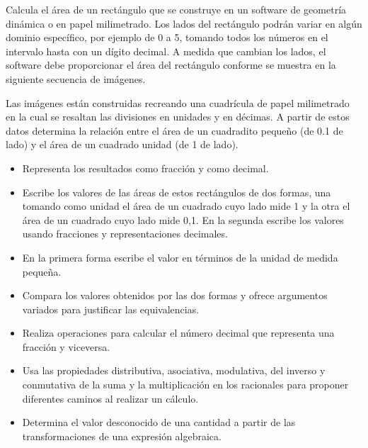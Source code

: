 \ejemplo

Calcula el área de un rectángulo que se construye en un software de geometría dinámica o en papel milimetrado. Los lados del rectángulo podrán variar en algún dominio específico, por ejemplo de 0 a 5, tomando todos los números en el intervalo hasta con un dígito decimal. A medida que cambian los lados, el software debe proporcionar el área del rectángulo conforme se muestra en la siguiente secuencia de imágenes.

Las imágenes están construidas recreando una cuadrícula de papel milimetrado en la cual se resaltan las divisiones en unidades y en décimas. A partir de estos datos determina la relación entre el área de un cuadradito pequeño (de 0.1 de lado) y el área de un cuadrado unidad (de 1 de lado).

\begin{itemize}
  \item Representa los resultados como fracción y como decimal.
  \item Escribe los valores de las áreas de estos rectángulos de dos formas, una tomando como unidad el área de un cuadrado cuyo lado mide 1 y la otra el área de un cuadrado cuyo lado mide 0,1. En la segunda escribe los valores usando fracciones y representaciones decimales.
  \item En la primera forma escribe el valor en términos de la unidad de medida pequeña.
  \item Compara los valores obtenidos por las dos formas y ofrece argumentos variados para justificar las equivalencias.
\end{itemize}


\evidencias

\begin{itemize}
  \item Realiza operaciones para calcular el número decimal que representa una fracción y viceversa.
  \item Usa las propiedades distributiva, asociativa, modulativa, del inverso y conmutativa de la suma y la multiplicación en los racionales para proponer diferentes caminos al realizar un cálculo.
  \item Determina el valor desconocido de una cantidad a partir de las transformaciones de una expresión algebraica.
\end{itemize}

